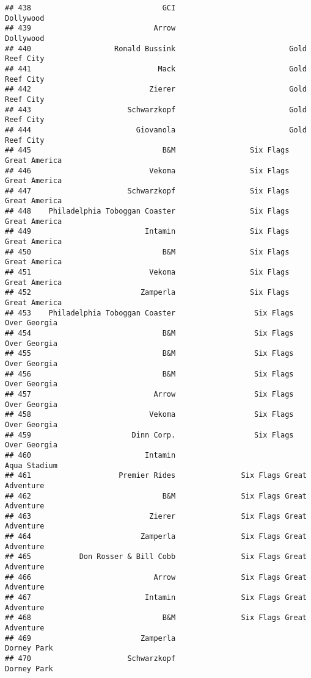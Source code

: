 \documentclass[
]{article}
\begin{document}
\begin{verbatim}
## 438                              GCI                               Dollywood
## 439                            Arrow                               Dollywood
## 440                   Ronald Bussink                          Gold Reef City
## 441                             Mack                          Gold Reef City
## 442                           Zierer                          Gold Reef City
## 443                      Schwarzkopf                          Gold Reef City
## 444                        Giovanola                          Gold Reef City
## 445                              B&M                 Six Flags Great America
## 446                           Vekoma                 Six Flags Great America
## 447                      Schwarzkopf                 Six Flags Great America
## 448    Philadelphia Toboggan Coaster                 Six Flags Great America
## 449                          Intamin                 Six Flags Great America
## 450                              B&M                 Six Flags Great America
## 451                           Vekoma                 Six Flags Great America
## 452                         Zamperla                 Six Flags Great America
## 453    Philadelphia Toboggan Coaster                  Six Flags Over Georgia
## 454                              B&M                  Six Flags Over Georgia
## 455                              B&M                  Six Flags Over Georgia
## 456                              B&M                  Six Flags Over Georgia
## 457                            Arrow                  Six Flags Over Georgia
## 458                           Vekoma                  Six Flags Over Georgia
## 459                       Dinn Corp.                  Six Flags Over Georgia
## 460                          Intamin                            Aqua Stadium
## 461                    Premier Rides               Six Flags Great Adventure
## 462                              B&M               Six Flags Great Adventure
## 463                           Zierer               Six Flags Great Adventure
## 464                         Zamperla               Six Flags Great Adventure
## 465           Don Rosser & Bill Cobb               Six Flags Great Adventure
## 466                            Arrow               Six Flags Great Adventure
## 467                          Intamin               Six Flags Great Adventure
## 468                              B&M               Six Flags Great Adventure
## 469                         Zamperla                             Dorney Park
## 470                      Schwarzkopf                             Dorney Park

\end{verbatim}
\end{document}
